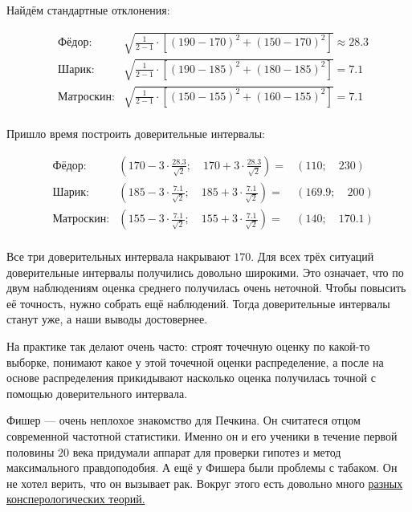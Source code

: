 \documentclass[12pt, a4paper, oneside]{article}
\theoremstyle{plain} %
\theoremstyle{definition}
\begin{document}
\begin{solution}
Найдём стандартные отклонения:

\begin{equation*} 
\begin{aligned} 
& \text{Фёдор:}  & \sqrt{ \frac{1}{2-1} \cdot \left[ (190 - 170)^2 + (150 - 170)^2 \right] } \approx 28.3 \\
& \text{Шарик:}  & \sqrt{ \frac{1}{2-1} \cdot \left[ (190 - 185)^2 + (180 - 185)^2 \right] } = 7.1 \\
& \text{Матроскин:} & \sqrt{ \frac{1}{2-1} \cdot \left[ (150 - 155)^2 + (160 - 155)^2 \right] }= 7.1 \\
\end{aligned}
\end{equation*}

Пришло время построить доверительные интервалы: 

\begin{equation*} 
\begin{aligned} 
& \text{Фёдор:}  & \left( 170 -  3 \cdot \frac{28.3}{\sqrt{2}}; \quad 170 + 3 \cdot \frac{28.3}{\sqrt{2}} \right) = &  (110; \quad 230) \\
& \text{Шарик:}  &  \left( 185 -  3 \cdot \frac{7.1}{\sqrt{2}}; \quad 185 + 3 \cdot \frac{7.1}{\sqrt{2}} \right) = &  (169.9; \quad 200) \\
& \text{Матроскин:} &  \left( 155 -  3 \cdot \frac{7.1}{\sqrt{2}}; \quad 155 + 3 \cdot \frac{7.1}{\sqrt{2}} \right) = &  (140; \quad 170.1) \\
\end{aligned}
\end{equation*}

Все три доверительных интервала накрывают $170$.  Для всех трёх ситуаций доверительные интервалы получились довольно широкими. Это означает, что по двум наблюдениям оценка среднего получилась очень неточной. Чтобы повысить её точность, нужно собрать ещё наблюдений. Тогда доверительные интервалы станут уже, а наши выводы достовернее.

На практике так делают очень часто: строят точечную оценку по какой-то выборке, понимают какое у этой точечной оценки распределение, а после на основе распределения прикидывают насколько оценка получилась точной с помощью доверительного интервала. 

Фишер --- очень неплохое знакомство для Печкина. Он считатеся отцом современной частотной статистики. Именно он и его ученики в течение первой половины $20$ века придумали аппарат для проверки гипотез и метод максимального правдоподобия. А ещё у Фишера были проблемы с табаком. Он не хотел верить, что он вызывает рак. Вокруг этого есть довольно много \href{https://lpgenerator.ru/blog/2016/10/23/pochemu-otec-sovremennoj-statistiki-ne-veril-chto-kurenie-vyzyvaet-rak/}{разных консперологических теорий.}
\end{solution}
\end{document}
